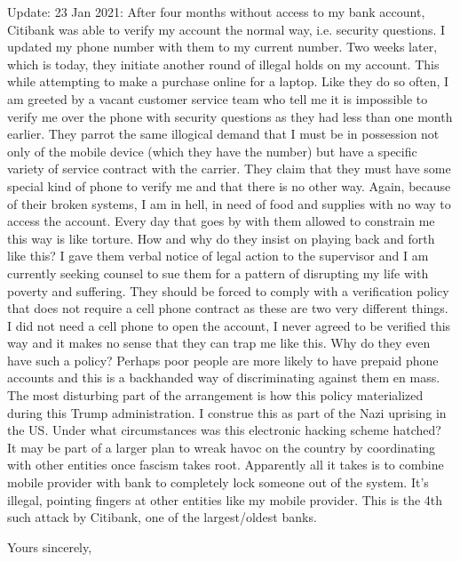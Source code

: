 \documentclass[a4paper]{arthur-letter}
\begin{document}
\begin{letter}
    Update: 23 Jan 2021: After four months without access to my bank account, Citibank was able to verify my account the normal way, i.e. security questions. I updated my phone number with them to my current number. Two weeks later, which is today, they initiate another round of illegal holds on my account. This while attempting to make a purchase online for a laptop. Like they do so often, I am greeted by a vacant customer service team who tell me it is impossible to verify me over the phone with security questions as they had less than one month earlier. They parrot the same illogical demand that I must be in possession not only of the mobile device (which they have the number) but have a specific variety of service contract with the carrier. They claim that they must have some special kind of phone to verify me and that there is no other way. Again, because of their broken systems, I am in hell, in need of food and supplies with no way to access the account. Every day that goes by with them allowed to constrain me this way is like torture. How and why do they insist on playing back and forth like this? I gave them verbal notice of legal action to the supervisor and I am currently seeking counsel to sue them for a pattern of disrupting my life with poverty and suffering. They should be forced to comply with a verification policy that does not require a cell phone contract as these are two very different things. I did not need a cell phone to open the account, I never agreed to be verified this way and it makes no sense that they can trap me like this. Why do they even have such a policy? Perhaps poor people are more likely to have prepaid phone accounts and this is a backhanded way of discriminating against them en mass. The most disturbing part of the arrangement is how this policy materialized during this Trump administration. I construe this as part of the Nazi uprising in the US. Under what circumstances was this electronic hacking scheme hatched? It may be part of a larger plan to wreak havoc on the country by coordinating with other entities once fascism takes root. Apparently all it takes is to combine mobile provider with bank to completely lock someone out of the system. It's illegal, pointing fingers at other entities like my mobile provider. This is the 4th such attack by Citibank, one of the largest/oldest banks.
    
            
            \closing{Yours sincerely,} %


    \end{letter}
    
\end{document}
